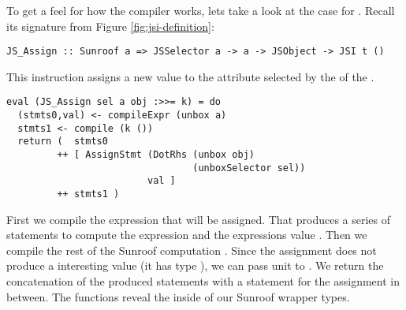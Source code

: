 To get a feel for how the compiler works, lets take a look at 
the case for . Recall its signature from 
Figure \ref{fig:jsi-definition}:
\begin{verbatim}
JS_Assign :: Sunroof a => JSSelector a -> a -> JSObject -> JSI t ()
\end{verbatim}
This instruction assigns a new value  to the attribute
selected by the  of the .
\begin{verbatim}
eval (JS_Assign sel a obj :>>= k) = do
  (stmts0,val) <- compileExpr (unbox a)
  stmts1 <- compile (k ())
  return (  stmts0 
         ++ [ AssignStmt (DotRhs (unbox obj) 
                                 (unboxSelector sel)) 
                         val ] 
         ++ stmts1 )
\end{verbatim}
First we compile the expression that will be assigned. That
produces a series of statements to compute the expression and 
the expressions value .
Then we compile the rest of the Sunroof computation . Since 
the assignment does not produce a interesting value (it has type ),
we can pass unit to .
We return the concatenation of the produced statements with a statement 
for the assignment in between. The  functions reveal the 
 inside of our Sunroof wrapper types.

